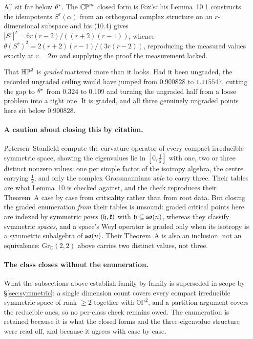 All sit far below $\theta^{*}$. The $\mathbb{CP}^m$ closed form is Fox's: his Lemma~10.1 constructs the idempotents $S^r(\alpha)$ from an orthogonal complex structure on an $r$-dimensional subspace and his (10.4) gives $|S^r|^2=6r(r-2)/((r+2)(r-1))$, whence $\theta(S^r)^2=2(r+2)(r-1)/(3r(r-2))$, reproducing the measured values exactly at $r=2m$ and supplying the proof the measurement lacked.

That $\mathbb{HP}^2$ is \emph{graded} mattered more than it looks. Had it been ungraded, the recorded ungraded ceiling would have jumped from $0.900828$ to $1.115547$, cutting the gap to $\theta^{*}$ from $0.324$ to $0.109$ and turning the ungraded half from a loose problem into a tight one. It is graded, and all three genuinely ungraded points here sit below $0.900828$.

\paragraph{A caution about closing this by citation.} Petersen--Stanfield \cite{ps2025} compute the curvature operator of every compact irreducible symmetric space, showing the eigenvalues lie in $[0,\tfrac12]$ with one, two or three distinct nonzero values: one per simple factor of the isotropy algebra, the centre carrying $\tfrac12$, and only the complex Grassmannians \emph{able} to carry three. Their tables are what Lemma~10 is checked against, and the check reproduces their Theorem~A case by case from criticality rather than from root data. But closing the graded enumeration \emph{from} their tables is unsound: graded critical points here are indexed by symmetric \emph{pairs} $(\mathfrak{h},\mathfrak{k})$ with $\mathfrak{h}\subseteq\mathfrak{so}(n)$, whereas they classify symmetric \emph{spaces}, and a space's Weyl operator is graded only when its isotropy is a symmetric subalgebra of $\mathfrak{so}(n)$. Their Theorem~A is also an inclusion, not an equivalence: $\mathrm{Gr}_{\mathbb C}(2,2)$ above carries two distinct values, not three.

\paragraph{The class closes without the enumeration.} What the subsections above establish family by family is superseded in scope by \S\ref{sec:symmetric}: a single dimension count covers every compact irreducible symmetric space of rank $\ge2$ together with $\mathbb{OP}^2$, and a partition argument covers the reducible ones, so no per-class check remains owed. The enumeration is retained because it is what the closed forms and the three-eigenvalue structure were read off, and because it agrees with \cite{ps2025} case by case.

